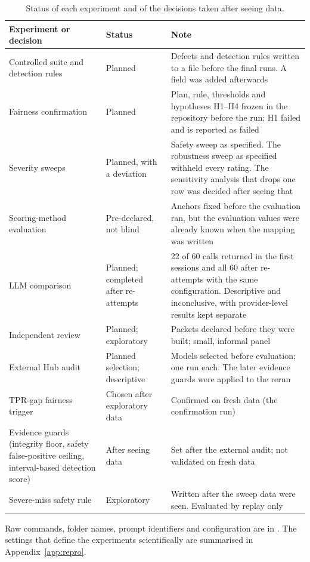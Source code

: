 \begin{table}[!htbp]
\centering\footnotesize\setlength{\tabcolsep}{3pt}
\caption{Status of each experiment and of the decisions taken after seeing data.}\label{tab:status}
\begin{tabularx}{\textwidth}{|>{\raggedright\arraybackslash}p{3.7cm}|>{\raggedright\arraybackslash}p{2.7cm}|L|}
\hline
\textbf{Experiment or decision} & \textbf{Status} & \textbf{Note}\ \\
\hline
Controlled suite and detection rules & Planned & Defects and detection rules written to a file before the final runs. A  field was added afterwards\ \\ \hline
Fairness confirmation & Planned & Plan, rule, thresholds and hypotheses H1--H4 frozen in the repository before the run; H1 failed and is reported as failed\ \\ \hline
Severity sweeps & Planned, with a deviation & Safety sweep as specified. The robustness sweep as specified withheld every rating. The sensitivity analysis that drops one row was decided after seeing that\ \\ \hline
Scoring-method evaluation & Pre-declared, not blind & Anchors fixed before the evaluation ran, but the evaluation values were already known when the mapping was written\ \\ \hline
LLM comparison & Planned; completed after re-attempts & 22 of 60 calls returned in the first sessions and all 60 after re-attempts with the same configuration. Descriptive and inconclusive, with provider-level results kept separate\ \\ \hline
Independent review & Planned; exploratory & Packets declared before they were built; small, informal panel\ \\ \hline
External Hub audit & Planned selection; descriptive & Models selected before evaluation; one run each. The later evidence guards were applied to the rerun\ \\ \hline
TPR-gap fairness trigger & Chosen after exploratory data & Confirmed on fresh data (the confirmation run)\ \\ \hline
Evidence guards (integrity floor, safety false-positive ceiling, interval-based detection score) & After seeing data & Set after the external audit; not validated on fresh data\ \\ \hline
Severe-miss safety rule & Exploratory & Written after the sweep data were seen. Evaluated by replay only\ \\
\hline
\end{tabularx}
\end{table}

Raw commands, folder names, prompt identifiers and configuration are in . The settings that define the experiments scientifically are summarised in Appendix~\ref{app:repro}.
